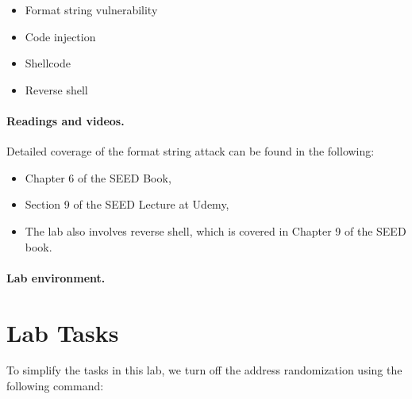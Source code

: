 \begin{itemize}[noitemsep]
\item Format string vulnerability
\item Code injection
\item Shellcode 
\item Reverse shell 
\end{itemize}


\noindent
{}


\paragraph{Readings and videos.}
Detailed coverage of the format string attack can be found in the following:

\begin{itemize}
\item Chapter 6 of the SEED Book, \seedbook
\item Section 9 of the SEED Lecture at Udemy, \seedcsvideo
\item The lab also involves reverse shell, which is covered in Chapter 9 of the SEED book.
\end{itemize}



\paragraph{Lab environment.} \seedenvironmentB



\newpage
\section{Lab Tasks}

To simplify the tasks in this lab, we turn off the address randomization
using the following command: 

